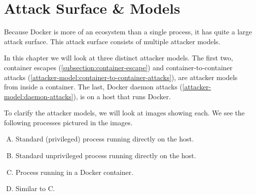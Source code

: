 \chapter{Attack Surface \& Models}\label{chapter:attack-surface-models}
Because Docker is more of an ecosystem than a single process, it has quite a large attack surface. This attack surface consists of multiple attacker models.

\medskip

In this chapter we will look at three distinct attacker models. The first two, container escapes (\autoref{subsection:container-escape}) and container-to-container attacks (\autoref{attacker-model:container-to-container-attacks}), are attacker models from inside a container. The last, Docker daemon attacks (\autoref{attacker-model:daemon-attacks}), is on a host that runs Docker.

\medskip

To clarify the attacker models, we will look at images showing each. We see the following processes pictured in the images.
\begin{enumerate}[A.]
    \item Standard (privileged) process running directly on the host.
    \item Standard unprivileged process running directly on the host.
    \item Process running in a Docker container.
    \item Similar to C.
\end{enumerate}




